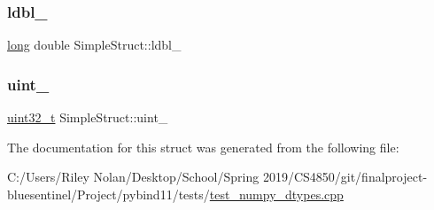 \mbox{\label{struct_simple_struct_a0acda54a97a0971c9672ff8772433a22}} 
\subsubsection{\texorpdfstring{ldbl\_}{ldbl\_}}
{\footnotesize\ttfamily \mbox{\hyperlink{modsupport_8h_a0cb68e00fb9fb1260ee2daadd9fe6611}{long}} double Simple\+Struct\+::ldbl\+\_\+}

\mbox{\label{struct_simple_struct_a7d5d19cdba8fe4db03afd905afcb08f6}} 
\subsubsection{\texorpdfstring{uint\_}{uint\_}}
{\footnotesize\ttfamily \mbox{\hyperlink{_s_d_l__config_8h_a435d1572bf3f880d55459d9805097f62}{uint32\+\_\+t}} Simple\+Struct\+::uint\+\_\+}



The documentation for this struct was generated from the following file\+:\begin{DoxyCompactItemize}
\item 
C\+:/\+Users/\+Riley Nolan/\+Desktop/\+School/\+Spring 2019/\+C\+S4850/git/finalproject-\/bluesentinel/\+Project/pybind11/tests/\mbox{\hyperlink{test__numpy__dtypes_8cpp}{test\+\_\+numpy\+\_\+dtypes.\+cpp}}\end{DoxyCompactItemize}
